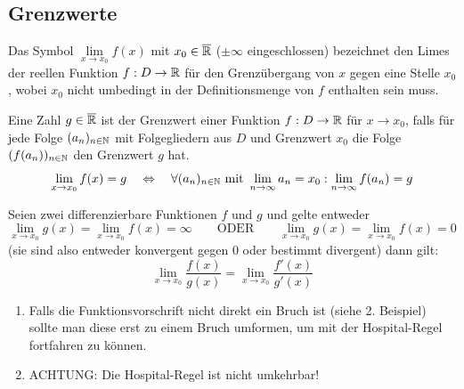 \documentclass[main.tex]{subfiles}
\begin{document}
\subsection{Grenzwerte}

\begin{Definition}
	Das Symbol $\lim\limits_{x \rightarrow x_{0}}f(x)$ mit $x_{0} \in \overline{\mathbb{R}}$ ($\pm \infty$ eingeschlossen) bezeichnet den Limes der reellen Funktion $f:D\rightarrow \mathbb{R}$ für den Grenzübergang von $x$ gegen eine Stelle $x_{0}$, wobei $x_{0}$ nicht umbedingt in der Definitionsmenge von $f$ enthalten sein muss.

	Eine Zahl $g \in \overline{\mathbb{R}}$ ist der Grenzwert einer Funktion $f:D\rightarrow \mathbb{R}$ für $x\rightarrow x_{0}$, falls für jede Folge $(a_{n})_{n\in \mathbb{N}}$ mit Folgegliedern aus $D$ und Grenzwert $x_{0}$ die Folge $(f(a_{n}))_{n\in \mathbb{N}}$ den Grenzwert $g$ hat.
	$$\lim\limits_{x \rightarrow x_{0}}f(x) = g \quad \Leftrightarrow \quad \forall (a_{n})_{n\in \mathbb{N}} \text{ mit } \lim\limits_{n \rightarrow \infty}a_{n}=x_{0} : \lim\limits_{n \rightarrow \infty}f(a_{n})=g$$
\end{Definition}

\begin{Theorem}
	Seien zwei differenzierbare Funktionen $f$ und $g$ und gelte entweder
	$$\lim\limits_{x \rightarrow x_{0}}g(x) = \lim\limits_{x \rightarrow x_{0}}f(x) = \infty \qquad \text{ODER} \qquad  \lim\limits_{x \rightarrow x_{0}}g(x) = \lim\limits_{x \rightarrow x_{0}}f(x) = 0$$
	(sie sind also entweder konvergent gegen $0$ oder bestimmt divergent) dann gilt:
	$$\lim\limits_{x \rightarrow x_{0}} \dfrac{f(x)}{g(x)} = \lim\limits_{x \rightarrow x_{0}}\dfrac{f'(x)}{g'(x)}$$
\end{Theorem}

\begin{Bemerkung}
	\begin{enumerate}
		\item Falls die Funktionsvorschrift nicht direkt ein Bruch ist (siehe 2. Beispiel) sollte man diese erst zu einem Bruch umformen, um mit der Hospital-Regel fortfahren zu können.
		\item ACHTUNG: Die Hospital-Regel ist nicht umkehrbar!
	\end{enumerate}
\end{Bemerkung}
\end{document}
